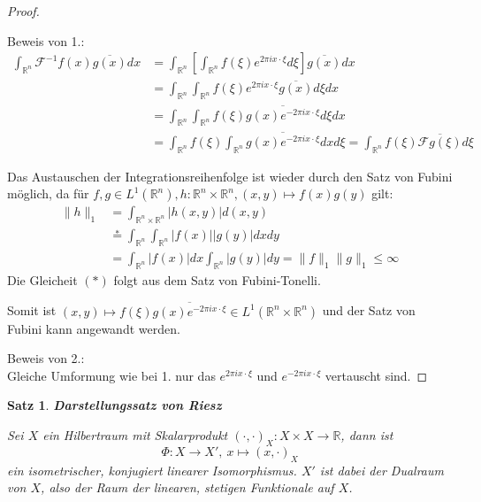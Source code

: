 \documentclass{article}
\newcommand{\R}[0]{\mathbb{R}}
\newcommand{\F}[0]{\mathcal{F}}
\newtheorem{thm}{Satz}
\begin{document}
\begin{proof}\cite[S. 427f.]{ebert2018methods}
    
    Beweis von 1.:\\
    \begin{align*}
        \int_{\R^n}\F^{-1}f(x)\overline{g(x)}dx &= \int_{\R^n} \left[ \int_{\R^n} f(\xi) e^{2 \pi i x \cdot \xi} d\xi \right] \overline{g(x)}dx \\
        &= \int_{\R^n} \int_{\R^n} f(\xi) e^{2 \pi i x \cdot \xi} \overline{g(x)} d\xi dx \\
        &= \int_{\R^n} \int_{\R^n} f(\xi) \overline{g(x) e^{-2 \pi i x \cdot \xi}} d\xi dx \\
        &= \int_{\R^n} f(\xi) \int_{\R^n} \overline{g(x) e^{-2 \pi i x \cdot \xi}} dx d\xi = \int_{\R^n}f(\xi)\overline{\F g(\xi)} d\xi
    \end{align*}

    Das Austauschen der Integrationsreihenfolge ist wieder durch den Satz von Fubini möglich, da für $f,g \in L^1(\R^n), h: \R^n \times \R^n, (x,y) \mapsto f(x)g(y)$ gilt:
    \begin{align*}
        \lVert h \rVert_1 &= \int_{\R^n \times \R^n} |h(x, y)| d(x,y) \\
        &\overset{*}{=} \int_{\R^n} \int_{\R^n} |f(x)| |g(y)| dx dy \\
        &= \int_{\R^n} |f(x)| dx \int_{\R^n} |g(y)| dy = \lVert f \rVert_1 \lVert g \rVert_1 \leq \infty
    \end{align*}
    Die Gleicheit $(*)$ folgt aus dem Satz von Fubini-Tonelli.
    
    Somit ist $(x,y) \mapsto f(\xi) \overline{g(x) e^{-2 \pi i x \cdot \xi}} \in L^1(\R^n \times \R^n)$ und der Satz von Fubini kann angewandt werden.

    Beweis von 2.:\\
    Gleiche Umformung wie bei 1. nur das $e^{2 \pi i x \cdot \xi}$ und $e^{-2 \pi i x \cdot \xi}$ vertauscht sind.
    
\end{proof}

\begin{thm}\label{thm:riesz} \textbf{Darstellungssatz von Riesz}
    
    Sei $X$ ein Hilbertraum mit Skalarprodukt $(\cdot, \cdot)_X: X \times X \to \R$, dann ist 
    \begin{equation}
        \varPhi: X \to X', \: x \mapsto (x, \cdot)_X
    \end{equation}
    ein isometrischer, konjugiert linearer Isomorphismus. $X'$ ist dabei der Dualraum von $X$, also der Raum der linearen, stetigen Funktionale auf $X$. 
\end{thm}
\end{document}
